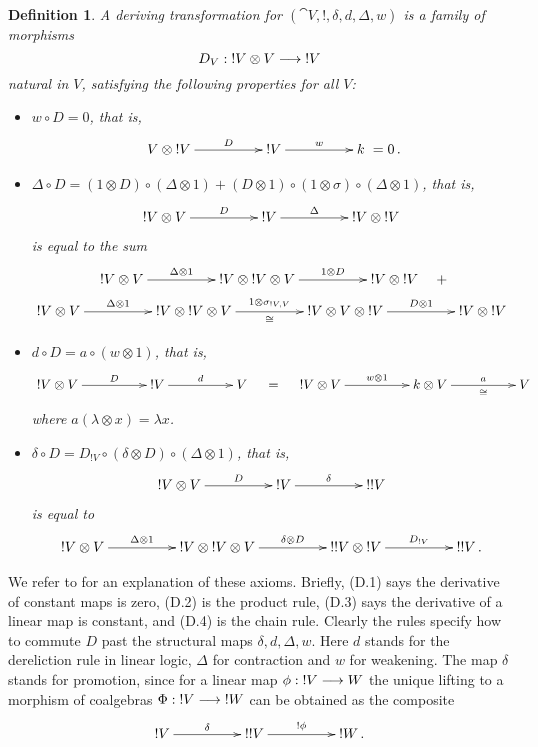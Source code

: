\documentclass[english,letter paper,12pt,reqno]{article}
\theoremstyle{example}
\newtheorem{definition}[theorem]{Definition}
\def\be{\begin{equation}}
\def\ee{\end{equation}}
\begin{document}
\begin{definition} A \emph{deriving transformation} for $(\cat{V}, {!}, \delta, d, \Delta, w)$ is a family of morphisms
\[
D_V: {!} V \otimes V \longrightarrow {!} V
\]
natural in $V$, satisfying the following properties for all $V$:
\begin{itemize}
\item[(D.1)] $w \circ D = 0$, that is,
\be
\xymatrix@C+2pc{
V \otimes {!} V \ar[r]^-{D} & {!} V \ar[r]^-{w} & k
} = 0\,.
\ee
\item[(D.2)] $\Delta \circ D = (1 \otimes D) \circ (\Delta \otimes 1) + (D \otimes 1) \circ (1 \otimes \sigma) \circ (\Delta \otimes 1)$, that is,
\be
\xymatrix@C+2pc{
{!} V \otimes V \ar[r]^-{D} & {!} V \ar[r]^-{\Delta} & {!} V \otimes {!} V
}
\ee
is equal to the sum
\begin{gather*}
\xymatrix@C+2pc{{!} V \otimes V \ar[r]^-{\Delta \otimes 1} & {!} V \otimes {!} V \otimes V \ar[r]^-{1 \otimes D} & {!} V \otimes {!} V} \quad +\\
\xymatrix@C+2pc{{!} V \otimes V \ar[r]^-{\Delta \otimes 1} & {!} V \otimes {!} V \otimes V \ar[r]^-{1 \otimes \sigma_{{!}V, V}}_{\cong} & {!} V \otimes V \otimes {!} V \ar[r]^-{D \otimes 1} & {!} V \otimes {!} V}
\end{gather*}
\item[(D.3)] $d \circ D = a \circ (w \otimes 1)$, that is,
\be
\xymatrix@C+2pc{
{!} V \otimes V \ar[r]^-{D} & {!} V \ar[r]^-{d} & V 
}
\quad = \quad
\xymatrix@C+2pc{
{!} V \otimes V \ar[r]^-{w \otimes 1} & k \otimes V \ar[r]^-{a}_-{\cong} & V
}
\ee
where $a(\lambda \otimes x) = \lambda x$.
\item[(D.4)] $\delta \circ D = D_{{!} V} \circ (\delta \otimes D) \circ (\Delta \otimes 1)$, that is,
\be
\xymatrix@C+2pc{
{!} V \otimes V \ar[r]^-{D} & {!} V \ar[r]^-{\delta} & {!}{!} V
}
\ee
is equal to
\be\label{eq:D4final}
\xymatrix@C+2pc{
{!} V \otimes V \ar[r]^-{\Delta \otimes 1} & {!} V \otimes {!} V \otimes V \ar[r]^-{\delta \otimes D} & {!}{!} V \otimes {!} V \ar[r]^-{D_{{!}V}} & {!}{!} V\,.
}
\ee
\end{itemize}
\end{definition}

We refer to \cite[\S 2.2]{blutecs} for an explanation of these axioms. Briefly, (D.1) says the derivative of constant maps is zero, (D.2) is the product rule, (D.3) says the derivative of a linear map is constant, and (D.4) is the chain rule. Clearly the rules specify how to commute $D$ past the structural maps $\delta, d, \Delta, w$. Here $d$ stands for the dereliction rule in linear logic, $\Delta$ for contraction and $w$ for weakening. The map $\delta$ stands for promotion, since for a linear map $\phi: {!} V \longrightarrow W$ the unique lifting to a morphism of coalgebras $\Phi: {!} V \longrightarrow {!} W$ can be obtained as the composite
\be
\xymatrix@C+2pc{
{!} V \ar[r]^-{\delta} & {!!} V \ar[r]^-{{!} \phi} & {!} W\,.
}
\ee
\end{document}
